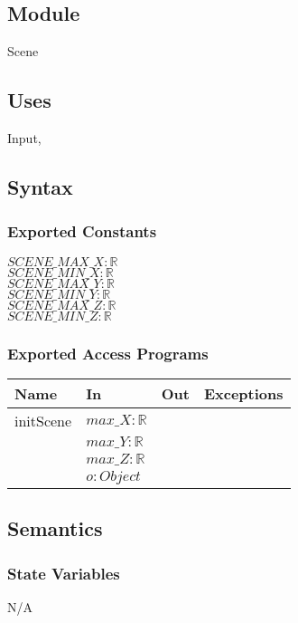 \documentclass[12pt, titlepage]{article}
\begin{document}
\subsection{Module}
Scene

\subsection{Uses}
Input,  

\subsection{Syntax}
\subsubsection{Exported Constants}
$SCENE\_MAX\_X : \mathbb{R}$\\
$SCENE\_MIN\_X : \mathbb{R}$\\
$SCENE\_MAX\_Y : \mathbb{R}$\\
$SCENE\_MIN\_Y : \mathbb{R}$\\
$SCENE\_MAX\_Z : \mathbb{R}$\\
$SCENE\_MIN\_Z : \mathbb{R}$\\
\subsubsection{Exported Access Programs}
\begin{center}
	\begin{tabular}{p{4cm} p{2cm} p{2cm} p{4cm}}
		\hline
		\textbf{Name} & \textbf{In} & \textbf{Out} & \textbf{Exceptions} \\
		\hline
		initScene & $max\_X : \mathbb{R}$ & & \\
		 & $max\_Y : \mathbb{R}$ & & \\		
		 & $max\_Z : \mathbb{R}$ & & \\				 
		 & $o : Object$ & & \\				 
		\hline
	\end{tabular}
\end{center}

\subsection{Semantics}
\subsubsection{State Variables}
N/A
\end{document}
